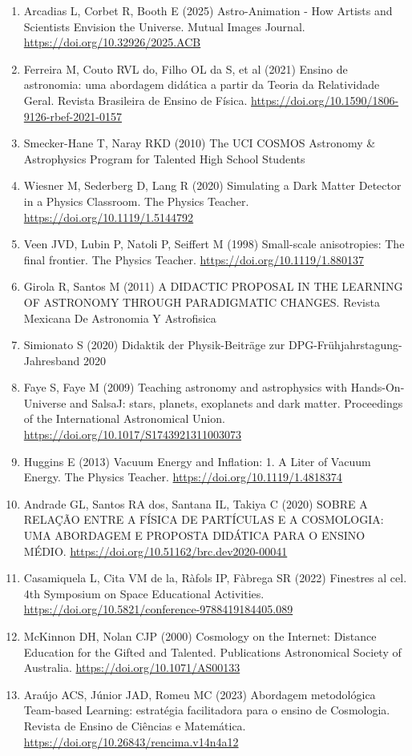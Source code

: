 {\begin{enumerate}
\item Arcadias L, Corbet R, Booth E (2025) Astro-Animation - How Artists and Scientists Envision the Universe. Mutual Images Journal. \url{https://doi.org/10.32926/2025.ACB}
\item Ferreira M, Couto RVL do, Filho OL da S, et al (2021) Ensino de astronomia: uma abordagem didática a partir da Teoria da Relatividade Geral. Revista Brasileira de Ensino de Física. \url{https://doi.org/10.1590/1806-9126-rbef-2021-0157}
\item Smecker-Hane T, Naray RKD (2010) The UCI COSMOS Astronomy \& Astrophysics Program for Talented High School Students
\item Wiesner M, Sederberg D, Lang R (2020) Simulating a Dark Matter Detector in a Physics Classroom. The Physics Teacher. \url{https://doi.org/10.1119/1.5144792}
\item Veen JVD, Lubin P, Natoli P, Seiffert M (1998) Small-scale anisotropies: The final frontier. The Physics Teacher. \url{https://doi.org/10.1119/1.880137}
\item Girola R, Santos M (2011) A DIDACTIC PROPOSAL IN THE LEARNING OF ASTRONOMY THROUGH PARADIGMATIC CHANGES. Revista Mexicana De Astronomia Y Astrofisica
\item Simionato S (2020) Didaktik der Physik-Beiträge zur DPG-Frühjahrstagung-Jahresband 2020
\item Faye S, Faye M (2009) Teaching astronomy and astrophysics with Hands-On-Universe and SalsaJ: stars, planets, exoplanets and dark matter. Proceedings of the International Astronomical Union. \url{https://doi.org/10.1017/S1743921311003073}
\item Huggins E (2013) Vacuum Energy and Inflation: 1. A Liter of Vacuum Energy. The Physics Teacher. \url{https://doi.org/10.1119/1.4818374}
\item Andrade GL, Santos RA dos, Santana IL, Takiya C (2020) SOBRE A RELAÇÃO ENTRE A FÍSICA DE PARTÍCULAS E A COSMOLOGIA: UMA ABORDAGEM E PROPOSTA DIDÁTICA PARA O ENSINO MÉDIO. \url{https://doi.org/10.51162/brc.dev2020-00041}
\item Casamiquela L, Cita VM de la, Ràfols IP, Fàbrega SR (2022) Finestres al cel. 4th Symposium on Space Educational Activities. \url{https://doi.org/10.5821/conference-9788419184405.089}
\item McKinnon DH, Nolan CJP (2000) Cosmology on the Internet: Distance Education for the Gifted and Talented. Publications Astronomical Society of Australia. \url{https://doi.org/10.1071/AS00133}
\item Araújo ACS, Júnior JAD, Romeu MC (2023) Abordagem metodológica Team-based Learning: estratégia facilitadora para o ensino de Cosmologia. Revista de Ensino de Ciências e Matemática. \url{https://doi.org/10.26843/rencima.v14n4a12}

\end{enumerate}}
